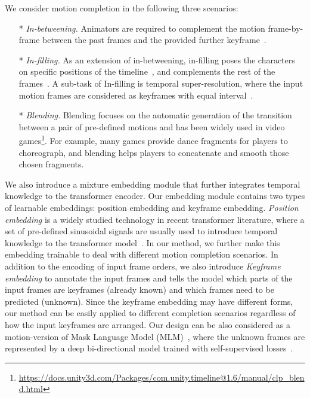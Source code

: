\documentclass[10pt,twocolumn,letterpaper]{article}
\begin{document}
We consider motion completion in the following three scenarios:

\begin{itemize}
\item[*] \emph{In-betweening.} Animators are required to complement the motion frame-by-frame between the past frames and the provided further keyframe~\cite{harvey2020robust}. 
\item[*] \emph{In-filling.} As an extension of in-betweening, in-filling poses the characters on specific positions of the timeline~\cite{ciccone2019tangent}, and complements the rest of the frames~\cite{kaufmann2020infilling}. A sub-task of In-filling is temporal super-resolution, where the input motion frames are considered as keyframes with equal interval~\cite{harvey2018recurrent}.
\item[*] \emph{Blending.} Blending focuses on the automatic generation of the transition between a pair of pre-defined motions and has been widely used in video games\footnote{\url{https://docs.unity3d.com/Packages/com.unity.timeline@1.6/manual/clp_blend.html}}. For example, many games provide dance fragments for players to choreograph, and blending helps players to concatenate and smooth those chosen fragments.
\end{itemize}

We also introduce a mixture embedding module that further integrates temporal knowledge to the transformer encoder. Our embedding module contains two types of learnable embeddings: position embedding and keyframe embedding. \emph{Position embedding} is a widely studied technology in recent transformer literature, where a set of pre-defined sinusoidal signals are usually used to introduce temporal knowledge to the transformer model~\cite{harvey2018recurrent,harvey2020robust}. In our method, we further make this embedding trainable to deal with different motion completion scenarios. In addition to the encoding of input frame orders, we also introduce \emph{Keyframe embedding} to annotate the input frames and tells the model which parts of the input frames are keyframes (already known) and which frames need to be predicted (unknown). Since the keyframe embedding may have different forms, our method can be easily applied to different completion scenarios regardless of how the input keyframes are arranged. Our design can be also considered as a motion-version of Mask Language Model (MLM)~\cite{taylor1953MLM}, where the unknown frames are represented by a deep bi-directional model trained with self-supervised losses~\cite{devlin2018bert}.
\end{document}
